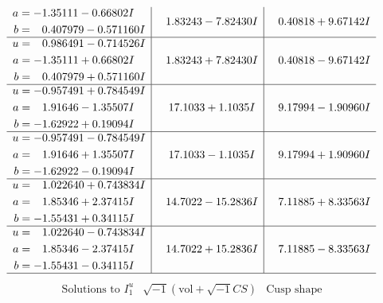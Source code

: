 \documentclass[1p]{elsarticle_modified}
\theoremstyle{definition}
\newcommand{\I}{\sqrt{-1}}
\begin{document}
$$\begin{array}{c|c|c}
\begin{aligned}
a &= -1.35111 - 0.66802 I \\
b &= \phantom{-}0.407979 - 0.571160 I\end{aligned}
 & \phantom{-}1.83243 - 7.82430 I & \phantom{-}0.40818 + 9.67142 I \\ \hline\begin{aligned}
u &= \phantom{-}0.986491 - 0.714526 I \\
a &= -1.35111 + 0.66802 I \\
b &= \phantom{-}0.407979 + 0.571160 I\end{aligned}
 & \phantom{-}1.83243 + 7.82430 I & \phantom{-}0.40818 - 9.67142 I \\ \hline\begin{aligned}
u &= -0.957491 + 0.784549 I \\
a &= \phantom{-}1.91646 - 1.35507 I \\
b &= -1.62922 + 0.19094 I\end{aligned}
 & \phantom{-}17.1033 + 1.1035 I & \phantom{-}9.17994 - 1.90960 I \\ \hline\begin{aligned}
u &= -0.957491 - 0.784549 I \\
a &= \phantom{-}1.91646 + 1.35507 I \\
b &= -1.62922 - 0.19094 I\end{aligned}
 & \phantom{-}17.1033 - 1.1035 I & \phantom{-}9.17994 + 1.90960 I \\ \hline\begin{aligned}
u &= \phantom{-}1.022640 + 0.743834 I \\
a &= \phantom{-}1.85346 + 2.37415 I \\
b &= -1.55431 + 0.34115 I\end{aligned}
 & \phantom{-}14.7022 - 15.2836 I & \phantom{-}7.11885 + 8.33563 I \\ \hline\begin{aligned}
u &= \phantom{-}1.022640 - 0.743834 I \\
a &= \phantom{-}1.85346 - 2.37415 I \\
b &= -1.55431 - 0.34115 I\end{aligned}
 & \phantom{-}14.7022 + 15.2836 I & \phantom{-}7.11885 - 8.33563 I\\
 \hline 
 \end{array}$$\newpage$$\begin{array}{c|c|c}  
\text{Solutions to }I^u_{1}& \I (\text{vol} + \sqrt{-1}CS) & \text{Cusp shape}\\
 \hline 
\begin{aligned}

\end{aligned}
\end{array}$$
\end{document}
